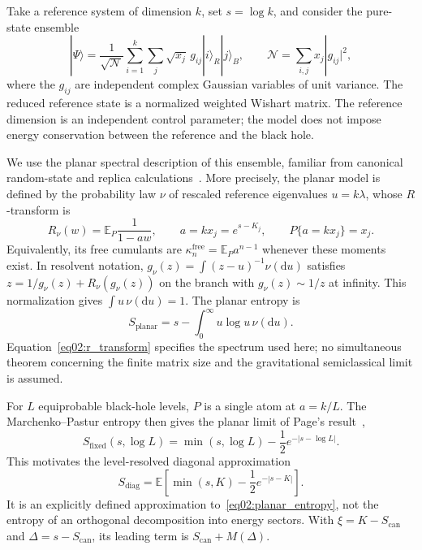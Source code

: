 \documentclass[11pt,letterpaper]{article}
\newcommand{\E}{\mathbb{E}}
\newcommand{\dd}{\mathrm{d}}
\theoremstyle{plain}
\theoremstyle{definition}
\theoremstyle{remark}
\begin{document}
Take a reference system of dimension $k$, set $s=\log k$, and consider the pure-state ensemble
\begin{equation}
 |\Psi\rangle=
 \frac{1}{\sqrt{\mathcal N}}
 \sum_{i=1}^{k}\sum_j \sqrt{x_j}\,g_{ij}
 |i\rangle_R|j\rangle_B,
 \qquad
 \mathcal N=\sum_{i,j}x_j|g_{ij}|^2,
 \label{eq02:random_state}
\end{equation}
where the $g_{ij}$ are independent complex Gaussian variables of unit variance. The reduced reference state is a normalized weighted Wishart matrix. The reference dimension is an independent control parameter; the model does not impose energy conservation between the reference and the black hole.

We use the planar spectral description of this ensemble, familiar from canonical random-state and replica calculations~\cite{pssy2022,wuebben2026}. More precisely, the planar model is defined by the probability law $\nu$ of rescaled reference eigenvalues $u=k\lambda$, whose $R$-transform is
\begin{equation}
 R_\nu(w)=\E_P\frac{1}{1-aw},\qquad
 a=kx_j=e^{s-K_j},\qquad P\{a=kx_j\}=x_j.
 \label{eq02:r_transform}
\end{equation}
Equivalently, its free cumulants are $\kappa_n^{\mathrm{free}}=\E_P a^{n-1}$ whenever these moments exist. In resolvent notation, $g_\nu(z)=\int(z-u)^{-1}\nu(\dd u)$ satisfies $z=1/g_\nu(z)+R_\nu(g_\nu(z))$ on the branch with $g_\nu(z)\sim1/z$ at infinity. This normalization gives $\int u\,\nu(\dd u)=1$. The planar entropy is
\begin{equation}
 S_{\mathrm{planar}}=s-\int_0^\infty u\log u\,\nu(\dd u).
 \label{eq02:planar_entropy}
\end{equation}
Equation~\eqref{eq02:r_transform} specifies the spectrum used here; no simultaneous theorem concerning the finite matrix size and the gravitational semiclassical limit is assumed.

For $L$ equiprobable black-hole levels, $P$ is a single atom at $a=k/L$. The Marchenko--Pastur entropy then gives the planar limit of Page's result~\cite{page1993},
\begin{equation}
 S_{\mathrm{fixed}}(s,\log L)
 =\min(s,\log L)-\frac12e^{-|s-\log L|}.
 \label{eq02:fixed_page}
\end{equation}
This motivates the level-resolved diagonal approximation
\begin{equation}
 S_{\mathrm{diag}}
 =\E\left[\min(s,K)-\frac12e^{-|s-K|}\right].
 \label{eq02:diagonal}
\end{equation}
It is an explicitly defined approximation to~\eqref{eq02:planar_entropy}, not the entropy of an orthogonal decomposition into energy sectors. With $\xi=K-S_{\mathrm{can}}$ and $\Delta=s-S_{\mathrm{can}}$, its leading term is $S_{\mathrm{can}}+M(\Delta)$.
\end{document}
